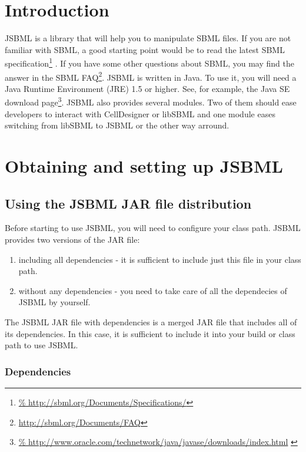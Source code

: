 \section{Introduction}

JSBML is a library that will help you to manipulate SBML files. If you are not
familiar with SBML, a good starting point would be to read the latest SBML
specification\footnote{\url{%
http://sbml.org/Documents/Specifications/}} \citep{Hucka2010a}. If you have some
other questions about SBML, you may find the answer in the SBML
FAQ\footnote{\url{http://sbml.org/Documents/FAQ}}. JSBML is written in Java\TTra. To
use it, you will need a Java Runtime Environment (JRE) 1.5 or higher. See, for
example, the Java SE download page\footnote{\url{%
http://www.oracle.com/technetwork/java/javase/downloads/index.html}
\label{fn:jvmldl}}.
JSBML also provides several modules. Two of them should ease developers to
interact with CellDesigner or libSBML and one module eases switching from
libSBML to JSBML or the other way arround.


\section{Obtaining and setting up JSBML}

\subsection{Using the JSBML JAR file distribution}
Before starting to use JSBML, you will need to configure your class path. JSBML
provides two versions of the JAR file:
\begin{enumerate}
\item including all dependencies - it is sufficient to include just this file in
      your class path.
\item without any dependencies - you need to take care of all the dependecies of
      JSBML by yourself.
\end{enumerate}

The JSBML JAR file with dependencies is a merged JAR file that includes all of
its dependencies. In this case, it is sufficient to include
it into your build or class path to use JSBML.



\subsubsection{Dependencies}
%

